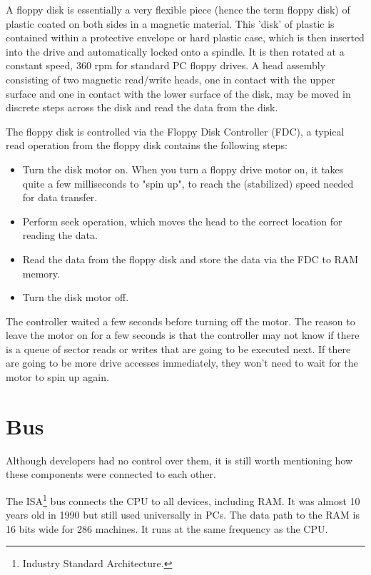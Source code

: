 \documentclass[book.tex]{subfiles}
\begin{document}
A floppy disk is essentially a very flexible piece (hence the term floppy disk) of plastic coated on both sides in a magnetic material. This 'disk' of plastic is contained within a protective envelope or hard plastic case, which is then inserted into the drive and automatically locked onto a spindle. It is then rotated at a constant speed, 360 rpm for standard PC floppy drives. A head assembly consisting of two magnetic read/write heads, one in contact with the upper surface and one in contact with the lower surface of the disk, may be moved in discrete steps across the disk and read the data from the disk.\\
\par
The floppy disk is controlled via the Floppy Disk Controller (FDC), a typical read operation from the floppy disk contains the following steps:
\begin{itemize}
  \item Turn the disk motor on. When you turn a floppy drive motor on, it takes quite a few milliseconds to "spin up", to reach the (stabilized) speed needed for data transfer.
  \item Perform seek operation, which moves the head to the correct location for reading the data.
  \item Read the data from the floppy disk and store the data via the FDC to RAM memory.
  \item Turn the disk motor off. 
\end{itemize}

The controller waited a few seconds before turning off the motor. The reason to leave the motor on for a few seconds is that the controller may not know if there is a queue of sector reads or writes that are going to be executed next. If there are going to be more drive accesses immediately, they won't need to wait for the motor to spin up again.\\




\section{Bus}
Although developers had no control over them, it is still worth mentioning how these components were connected to each other.\\ 
\par

The ISA\footnote{Industry Standard Architecture.} bus connects the CPU to all devices, including RAM. It was almost 10 years old in 1990 but still used universally in PCs. The data path to the RAM is 16 bits wide for 286 machines. It runs at the same frequency as the CPU.\\
\par
\end{document}
